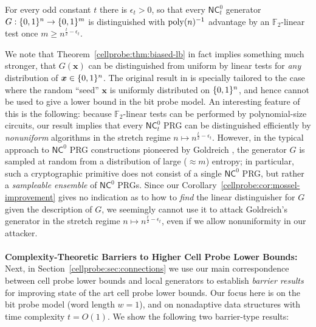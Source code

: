 \begin{corollary}
\label{cellprobe:cor:mossel-improvement}
For every odd constant $t$ there is $\epsilon_t>0$, so that every $\mathsf{NC}^0_t$ generator $G: \{0,1\}^n \to \{0,1\}^m$ is distinguished with $\mathrm{poly}(n)^{-1}$ advantage by an $\mathbb{F}_2$-linear test once $m \geq n^{\frac{t}{2} - \epsilon_t}$.
\end{corollary}
We note that Theorem~\ref{cellprobe:thm:biased-lb} in fact implies something much stronger, that $G(\bm{x})$ can be distinguished from uniform by linear tests for \emph{any} distribution of $\bm{x} \in \{0,1\}^n$. The original result in \cite{mossel-epsilon} is specially tailored to the case where the random ``seed'' $\bm{x}$ is uniformly distributed on $\{0,1\}^n$, and hence cannot be used to give a lower bound in the bit probe model. 
An interesting feature of this is the following: because $\mathbb{F}_2$-linear tests can be performed by polynomial-size circuits, our result implies that every $\mathsf{NC}^0_t$ PRG can be distinguished efficiently by \emph{nonuniform} algorithms in the stretch regime $n \mapsto n^{\frac{t}{2} - \epsilon_t}$. However, in the typical approach to $\mathsf{NC}^0$ PRG constructions pioneered by Goldreich \cite{goldreich-prg}, the generator $G$ is sampled at random from a distribution of large ($\approx m$) entropy; in particular, such a cryptographic primitive does not consist of a single $\mathsf{NC}^0$ PRG, but rather a \emph{sampleable ensemble} of $\mathsf{NC}^0$ PRGs. Since our Corollary~\ref{cellprobe:cor:mossel-improvement} gives no indication as to how to \emph{find} the linear distinguisher for $G$ given the description of $G$, we seemingly cannot use it to attack Goldreich's generator in the stretch regime $n \mapsto n^{\frac{t}{2} - \epsilon_t}$, even if we allow nonuniformity in our attacker.
~\\~\\
{\bf \noindent Complexity-Theoretic Barriers to Higher Cell Probe Lower Bounds:}
Next, in Section~\ref{cellprobe:sec:connections} we use our main correspondence between cell probe lower bounds and local generators to establish \emph{barrier results} for improving state of the art cell probe lower bounds. Our focus here is on the bit probe model (word length $w=1$), and on nonadaptive data structures with time complexity $t =O(1)$. We show the following two barrier-type results:

%  

